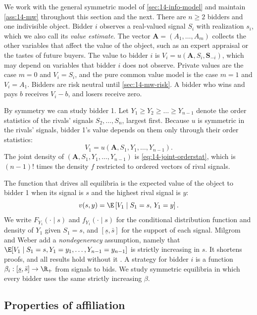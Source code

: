 We work with the general symmetric model of \cref{sec:14-info-model} and maintain \cref{ass:14-mw}
throughout this section and the next. There are $n\ge 2$ bidders and one indivisible object. Bidder $i$
observes a real-valued signal $S_i$ with realization $s_i$, which we also call its \emph{value estimate}. The
vector $\bm A=(A_1,\dots,A_m)$ collects the other variables that affect the value of the object, such as an
expert appraisal or the tastes of future buyers. The value to bidder $i$ is $V_i=u(\bm A,S_i,\bm S_{-i})$,
which may depend on variables that bidder $i$ does not observe. Private values are the case $m=0$ and
$V_i=S_i$, and the pure common value model is the case $m=1$ and $V_i=A_1$. Bidders are risk neutral until
\cref{sec:14-mw-risk}. A bidder who wins and pays $b$ receives $V_i-b$, and losers receive zero.

By symmetry we can study bidder 1. Let $Y_1\ge Y_2\ge\dots\ge Y_{n-1}$ denote the order statistics of the
rivals' signals $S_2,\dots,S_n$, largest first. Because $u$ is symmetric in the rivals' signals, bidder 1's
value depends on them only through their order statistics:
\begin{equation}\label{eq:14-mw-V1}
  V_1=u(\bm A,S_1,Y_1,\dots,Y_{n-1}).
\end{equation}
The joint density of $(\bm A,S_1,Y_1,\dots,Y_{n-1})$ is \eqref{eq:14-joint-orderstat}, which is
$(n-1)!$ times the density $f$ restricted to ordered vectors of rival signals.

The function that drives all equilibria is the expected value of the object to bidder 1 when its signal is
$s$ and the highest rival signal is $y$:
\begin{equation}\label{eq:14-mw-v}
  v(s,y)=\E\left[V_1\mid S_1=s,\,Y_1=y\right].
\end{equation}
We write $F_{Y_1}(\cdot\mid s)$ and $f_{Y_1}(\cdot\mid s)$ for the conditional distribution function and
density of $Y_1$ given $S_1=s$, and $[\underline s,\bar s]$ for the support of each signal. Milgrom and Weber
add a \emph{nondegeneracy} assumption, namely that $\E[V_1\mid S_1=s,Y_1=y_1,\dots,Y_{n-1}=y_{n-1}]$ is
strictly increasing in $s$. It shortens proofs, and all results hold without it
\citep[p.~1100]{MilgromWeber1982}. A strategy for bidder $i$ is a function $\beta_i:[\underline s,\bar s]\to\R_+$
from signals to bids. We study symmetric equilibria in which every bidder uses the same strictly increasing
$\beta$.

\subsection{Properties of affiliation}\label{sec:14-mw-affil}

